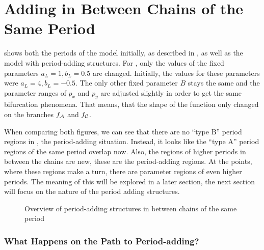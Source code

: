 \section{Adding in Between Chains of the Same Period}

 shows both the periods of the model initially, as described in , as well as the model with period-adding structures.
For , only the values of the fixed parameters $a_L = 1, b_L = 0.5$ are changed.
Initially, the values for these parameters were $a_L = 4, b_L = -0.5$.
The only other fixed parameter $B$ stays the same and the parameter ranges of $p_x$ and $p_y$ are adjusted slightly in order to get the same bifurcation phenomena.
That means, that the shape of the function only changed on the branches $f_{\mathcal{A}}$ and $f_{\mathcal{C}}$.

When comparing both figures, we can see that there are no ``type B'' period regions in , the period-adding situation.
Instead, it looks like the ``type A'' period regions of the same period overlap now.
Also, the regions of higher periods in between the chains are new, these are the period-adding regions.
At the points, where these regions make a turn, there are parameter regions of even higher periods.
The meaning of this will be explored in a later section, the next section will focus on the nature of the period adding structures.

\begin{figure}
    \centering
    \caption{Overview of period-adding structures in between chains of the same period}
    \label{fig:minrep.adding1.overview}
\end{figure}





\subsubsection{What Happens on the Path to Period-adding?}

